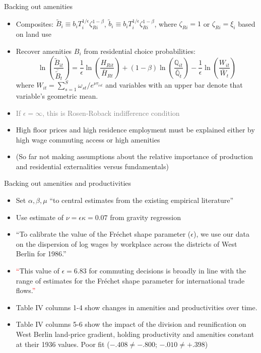 \documentclass[11pt,notes=hide,aspectratio=169]{beamer}
\begin{document}
\begin{frame}{Backing out amenities}
\begin{itemize}
\item Composites:
$\tilde{B}_{i} \equiv b_i T_i^{1/\epsilon}\zeta_{Ri}^{1-\beta}$,
$\tilde{b}_{i} \equiv b_i T_i^{1/\epsilon}\zeta_{Ri}^{1-\beta}$,
where
$\zeta_{Ri} = 1$ or $\zeta_{Ri} = \xi_{i}$ based on land use
\item Recover amenities $B_{i}$ from residential choice probabilities:
\begin{equation*}
\ln\left(\frac{\tilde{B}_{it}}{\bar{\tilde{B}}_{t}} \right) = \frac{1}{\epsilon} \ln \left(\frac{H_{Rit}}{\bar{H}_{Rt}} \right) +  (1-\beta) \ln \left(\frac{\mathbb{Q}_{it}}{\bar{\mathbb{Q}}_t} \right)
- \frac{1}{\epsilon} \ln \left(\frac{W_{it}}{\bar{W}_t} \right)
\end{equation*}
where $W_{it} = \sum_{s=1}^{S} \omega_{st} / e^{\nu \tau_{ist}}$  and variables with an upper bar denote that variable's geometric mean.
\item[] \textcolor{gray}{If $\epsilon = \infty$, this is Rosen-Roback indifference condition}
\item High floor prices and high residence employment must be explained either by high wage commuting access or high amenities
\item (So far not making assumptions about the relative importance of production and residential externalities versus fundamentals) 
\end{itemize}
\end{frame}
\begin{frame}{Backing out amenities and productivities }
\begin{itemize}
\item Set $\alpha, \beta, \mu$ ``to central estimates from the existing empirical literature''
\item Use estimate of $\nu = \epsilon \kappa = 0.07$ from gravity regression
\item ``To calibrate the value of the Fréchet shape parameter ($\epsilon$), we use our data on the dispersion of log wages by workplace across the districts of West Berlin for 1986.''
\item \textcolor{red}{``}This value of $\epsilon = 6.83$ for commuting decisions is broadly in line with the range of estimates for the Fréchet shape parameter for international trade flows.\textcolor{red}{''}
\item Table IV columns 1-4 show changes in amenities and productivities over time.
\item Table IV columns 5-6 show the impact of the division and reunification on West Berlin land-price gradient, holding productivity and amenities constant at their 1936 values. Poor fit ($-.408 \neq -.800$; $-.010 \neq +.398$)
\end{itemize}
\end{frame}
\end{document}
